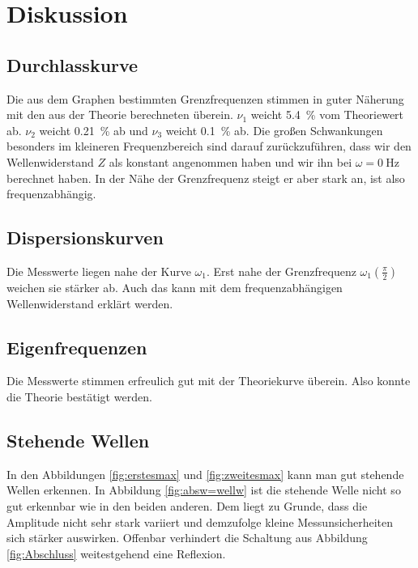 \section{Diskussion}
\label{sec:Diskussion}

\subsection{Durchlasskurve}

Die aus dem Graphen bestimmten Grenzfrequenzen stimmen in guter Näherung mit
den aus der Theorie berechneten überein. $\nu_1$ weicht \SI{5.4}{\percent} vom
Theoriewert ab. $\nu_2$ weicht \SI{0.21}{\percent} ab und $\nu_3$ weicht \SI{0.1}{\percent}
ab. Die großen Schwankungen besonders im kleineren Frequenzbereich sind darauf
zurückzuführen, dass wir den Wellenwiderstand $Z$ als konstant angenommen haben und
wir ihn bei $\omega = \SI{0}{\hertz}$ berechnet haben. In der Nähe der Grenzfrequenz
steigt er aber stark an, ist also frequenzabhängig.

\subsection{Dispersionskurven}

Die Messwerte liegen nahe der Kurve $\omega_1$. Erst nahe der Grenzfrequenz
$\omega_1(\frac{\pi}{2})$ weichen sie stärker ab. Auch das kann mit dem
frequenzabhängigen Wellenwiderstand erklärt werden.

\subsection{Eigenfrequenzen}

Die Messwerte stimmen erfreulich gut mit der Theoriekurve überein. Also konnte die
Theorie bestätigt werden.

\subsection{Stehende Wellen}

In den Abbildungen \ref{fig:erstesmax} und \ref{fig:zweitesmax}
kann man gut stehende Wellen erkennen. In Abbildung \ref{fig:absw=wellw} ist die
stehende Welle nicht so gut erkennbar wie in den beiden anderen. Dem liegt zu Grunde,
dass die Amplitude nicht sehr stark variiert und demzufolge kleine Messunsicherheiten
sich stärker auswirken. Offenbar verhindert die Schaltung aus Abbildung \ref{fig:Abschluss}
weitestgehend eine Reflexion.
